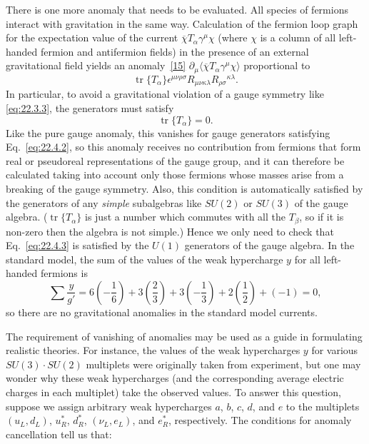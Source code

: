 There is one more anomaly that needs to be evaluated. All species of
fermions interact with gravitation in the same way. Calculation of the
fermion loop graph for the expectation value of the current
$\overline\chi T_\alpha\gamma^\mu\chi$ (where $\chi$ is a column of all
left-handed fermion and antifermion fields) in the presence of an external
gravitational field yields an anomaly~\hyperref[ch22-ref-15]{[15]}
$\partial_\mu\langle\overline\chi T_\alpha\gamma^\mu\chi\rangle$
proportional to
\[
 \operatorname{tr}\{T_\alpha\}\epsilon^{\mu\nu\rho\sigma}
 R_{\mu\nu\kappa\lambda}R_{\rho\sigma}{}^{\kappa\lambda}.
\]
In particular, to avoid a gravitational violation of a gauge symmetry like
\eqref{eq:22.3.3}, the generators must satisfy
\begin{equation}
 \operatorname{tr}\{T_\alpha\}=0.
 \tag{22.4.3}\label{eq:22.4.3}
\end{equation}
Like the pure gauge anomaly, this vanishes for gauge generators satisfying
Eq.~\eqref{eq:22.4.2}, so this anomaly receives no contribution from
fermions that form real or pseudoreal representations of the gauge group,
and it can therefore be calculated taking into account only those fermions
whose masses arise from a breaking of the gauge symmetry. Also, this
condition is automatically satisfied by the generators of any
\emph{simple} subalgebras like $SU(2)$ or $SU(3)$ of the gauge algebra.
($\operatorname{tr}\{T_\alpha\}$ is just a number which commutes with all
the $T_\beta$, so if it is non-zero then the algebra is not simple.) Hence
we only need to check that Eq.~\eqref{eq:22.4.3} is satisfied by the $U(1)$
generators of the gauge algebra. In the standard model, the sum of the
values of the weak hypercharge $y$ for all left-handed fermions is
\[
 \sum\frac{y}{g'}
 =6\left(-\frac{1}{6}\right)
 +3\left(\frac{2}{3}\right)
 +3\left(-\frac{1}{3}\right)
 +2\left(\frac{1}{2}\right)+(-1)=0,
\]
so there are no gravitational anomalies in the standard model currents.

The requirement of vanishing of anomalies may be used as a guide in
formulating realistic theories. For instance, the values of the weak
hypercharges $y$ for various $SU(3)\cdot SU(2)$ multiplets were originally
taken from experiment, but one may wonder why these weak hypercharges (and
the corresponding average electric charges in each multiplet) take the
observed values. To answer this question, suppose we assign arbitrary weak
hypercharges $a$, $b$, $c$, $d$, and $e$ to the multiplets
$(u_L,d_L)$, $u_R^*$, $d_R^*$, $(\nu_L,e_L)$, and $e_R^*$,
respectively. The conditions for anomaly cancellation tell us that:

